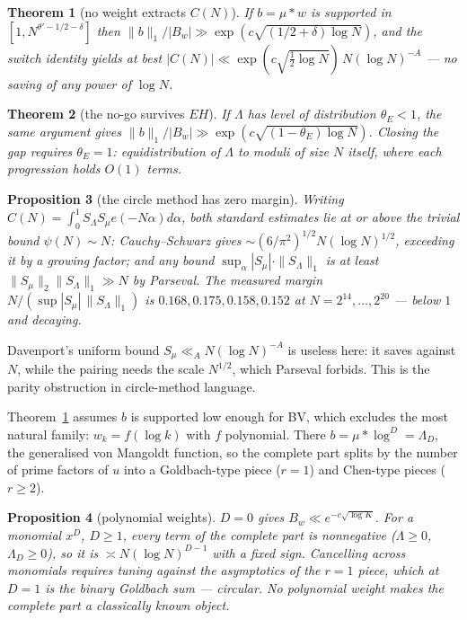 \documentclass[11pt,a4paper]{article}
\theoremstyle{plain}
\newtheorem{theorem}{Theorem}
\newtheorem{proposition}[theorem]{Proposition}
\theoremstyle{definition}
\begin{document}
\begin{theorem}[no weight extracts $C(N)$]\label{thm:D}
If $b=\mu*w$ is supported in $[1,N^{\theta'-1/2-\delta}]$ then
$\|b\|_1/|B_w| \gg \exp(c\sqrt{(1/2+\delta)\log N})$, and the switch
identity yields at best
$|C(N)|\ll \exp(c\sqrt{\tfrac12\log N})\,N(\log N)^{-A}$ --- no saving
of any power of $\log N$.
\end{theorem}

\begin{theorem}[the no-go survives $EH$]\label{thm:Dprime}
If $\Lambda$ has level of distribution $\theta_E<1$, the same argument
gives $\|b\|_1/|B_w| \gg \exp(c\sqrt{(1-\theta_E)\log N})$. Closing the
gap requires $\theta_E=1$: equidistribution of $\Lambda$ to moduli of
size $N$ itself, where each progression holds $O(1)$ terms.
\end{theorem}

\begin{proposition}[the circle method has zero margin]\label{prop:E}
Writing $C(N)=\int_0^1 S_\Lambda S_\mu e(-N\alpha)d\alpha$, both
standard estimates lie at or above the trivial bound $\psi(N)\sim N$:
Cauchy--Schwarz gives $\sim(6/\pi^2)^{1/2}N(\log N)^{1/2}$, exceeding
it by a growing factor; and any bound
$\sup_\alpha|S_\mu|\cdot\|S_\Lambda\|_1$ is at least
$\|S_\mu\|_2\|S_\Lambda\|_1\gg N$ by Parseval. The measured margin
$N/(\sup|S_\mu|\,\|S_\Lambda\|_1)$ is $0.168,0.175,0.158,0.152$ at
$N=2^{14},\dots,2^{20}$ --- below $1$ and decaying.
\end{proposition}

Davenport's uniform bound $S_\mu\ll_A N(\log N)^{-A}$ is useless here:
it saves against $N$, while the pairing needs the scale $N^{1/2}$,
which Parseval forbids. This is the parity obstruction in
circle-method language.

Theorem~\ref{thm:D} assumes $b$ is supported low enough for BV, which
excludes the most natural family: $w_k=f(\log k)$ with $f$ polynomial.
There $b=\mu*\log^D=\Lambda_D$, the generalised von Mangoldt function,
so the complete part splits by the number of prime factors of $u$ into
a Goldbach-type piece ($r=1$) and Chen-type pieces ($r\ge2$).

\begin{proposition}[polynomial weights]\label{prop:Dpp}
$D=0$ gives $B_w\ll e^{-c\sqrt{\log K}}$. For a monomial $x^D$,
$D\ge1$, every term of the complete part is nonnegative
($\Lambda\ge0$, $\Lambda_D\ge0$), so it is $\asymp N(\log N)^{D-1}$
with a fixed sign. Cancelling across monomials requires tuning against
the asymptotics of the $r=1$ piece, which at $D=1$ is the binary
Goldbach sum --- circular. No polynomial weight makes the complete
part a classically known object.
\end{proposition}
\end{document}
